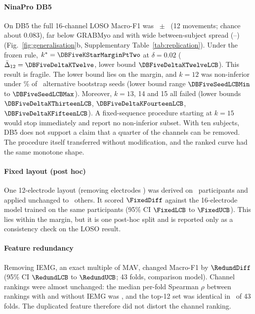 \paragraph{NinaPro DB5}
On DB5 the full 16-channel LOSO Macro-F1 was \DBFiveFull\ $\pm$ \DBFiveFullSD\ (12 movements; chance about 0.083), far below GRABMyo and with wide between-subject spread (\DBFiveFullMin--\DBFiveFullMax) (Fig.~\ref{fig:generalisation}b, Supplementary Table~\ref{tab:replication}). Under the frozen rule, $k^* = \DBFiveKStarMarginPtTwo$ at $\delta = 0.02$ ($\bar\Delta_{12} = \DBFiveDeltaKTwelve$, lower bound $\DBFiveDeltaKTwelveLCB$). This result is fragile. The lower bound lies on the margin, and $k = 12$ was non-inferior under \DBFiveSeedFrac\% of \DBFiveSeedN\ alternative bootstrap seeds (lower bound range $\DBFiveSeedLCBMin$ to $\DBFiveSeedLCBMax$). Moreover, $k = 13$, 14 and 15 all failed (lower bounds $\DBFiveDeltaKThirteenLCB$, $\DBFiveDeltaKFourteenLCB$, $\DBFiveDeltaKFifteenLCB$). A fixed-sequence procedure starting at $k = 15$ would stop immediately and report no non-inferior subset. With ten subjects, DB5 does not support a claim that a quarter of the channels can be removed. The procedure itself transferred without modification, and the ranked curve had the same monotone shape.

\paragraph{Fixed layout (post hoc)}
One 12-electrode layout (removing electrodes \FixedDropped) was derived on \FixedDev\ participants and applied unchanged to \FixedTest\ others. It scored $\FixedDiff$ against the 16-electrode model trained on the same participants (95\% CI $\FixedLCB$ to $\FixedUCB$). This lies within the margin, but it is one post-hoc split and is reported only as a consistency check on the LOSO result.

\paragraph{Feature redundancy}
Removing IEMG, an exact multiple of MAV, changed Macro-F1 by $\RedundDiff$ (95\% CI $\RedundLCB$ to $\RedundUCB$; 43 folds, comparison model). Channel rankings were almost unchanged: the median per-fold Spearman $\rho$ between rankings with and without IEMG was \RedundRho, and the top-12 set was identical in \RedundTopTwelveSame\ of 43 folds. The duplicated feature therefore did not distort the channel ranking.
